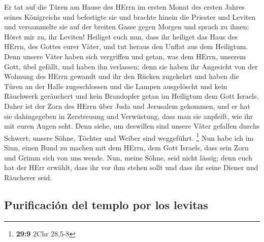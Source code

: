  Er tat auf die Türen am Hause des HErrn im ersten Monat
des ersten Jahres seines Königreichs und befestigte sie 
und brachte hinein die Priester und Leviten und versammelte sie auf der
breiten Gasse gegen Morgen  und sprach zu ihnen: Höret mir
zu, ihr Leviten! Heiliget euch nun, dass ihr heiliget das Haus des
HErrn, des Gottes eurer Väter, und tut heraus den Unflat aus dem
Heiligtum.  Denn unsere Väter haben sich vergriffen und
getan, was dem HErrn, unserem Gott, übel gefällt, und haben ihn
verlassen; denn sie haben ihr Angesicht von der Wohnung des HErrn
gewandt und ihr den Rücken zugekehrt  und haben die Türen
an der Halle zugeschlossen und die Lampen ausgelöscht und kein Räuchwerk
geräuchert und kein Brandopfer getan im Heiligtum dem Gott Israels.
 Daher ist der Zorn des HErrn über Juda und Jerusalem
gekommen, und er hat sie dahingegeben in Zerstreuung und Verwüstung,
dass man sie anpfeift, wie ihr mit euren Augen seht.  Denn
siehe, um deswillen sind unsere Väter gefallen durchs Schwert; unsere
Söhne, Töchter und Weiber sind weggeführt. \footnote{\textbf{29:9} 2Chr
  28,5-8}  Nun habe ich im Sinn, einen Bund zu machen mit
dem HErrn, dem Gott Israels, dass sein Zorn und Grimm sich von uns
wende.  Nun, meine Söhne, seid nicht lässig; denn euch
hat der HErr erwählt, dass ihr vor ihm stehen sollt und dass ihr seine
Diener und Räucherer seid.

\hypertarget{purificaciuxf3n-del-templo-por-los-levitas}{%
\subsection{Purificación del templo por los
levitas}\label{purificaciuxf3n-del-templo-por-los-levitas}}

